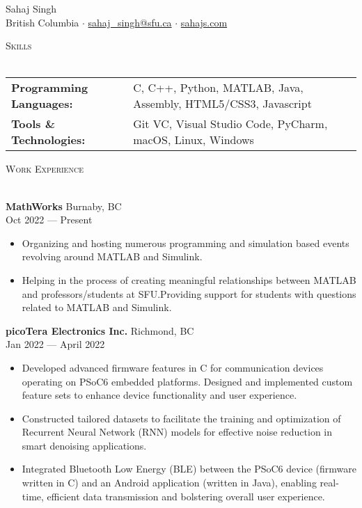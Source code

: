 \documentclass[a4paper]{article}
\newcommand{\lineunder} {
    \vspace*{-8pt} \\
    \hspace*{-18pt} \hrulefill\\
}
\newcommand{\header} [1] {
    {\hspace*{-18pt}\vspace*{6pt} \textsc{#1}}
    \vspace*{-6pt} \lineunder{}
}
\begin{document}
\vspace*{-40pt}

\vspace*{-10pt}
\begin{center}
	{\Huge {Sahaj Singh}}\\
    \vspace{1mm}
	British Columbia $\cdot$ \href{mailto:sahaj_singh@sfu.ca}{sahaj\_singh@sfu.ca} $\cdot$ \href{http://sahajs.com}{sahajs.com}\\
\end{center}

\header{Skills}
\begin{tabular}{ l l }
	\textbf{Programming Languages:} & C, C++, Python, MATLAB, Java, Assembly, HTML5/CSS3, Javascript \\
	\textbf{Tools \& Technologies:} & Git VC, Visual Studio Code, PyCharm, macOS, Linux, Windows         \\
\end{tabular}
\vspace{2mm}

\header{Work Experience}
\vspace{1mm}

\textbf{MathWorks} \hfill Burnaby, BC\\
 \hfill Oct 2022 --- Present\\
\vspace{-3mm}
\begin{itemize} \itemsep-3pt
	\item Organizing and hosting numerous programming and simulation based events revolving around MATLAB and Simulink.
	\item Helping in the process of creating meaningful relationships between MATLAB and professors/students at SFU.\@ Providing support for students with questions related to MATLAB and Simulink.
\end{itemize}
\vspace{-1mm}
\textbf{picoTera Electronics Inc.} \hfill Richmond, BC\\
 \hfill Jan 2022 --- April 2022\\
\vspace{-3mm}
\begin{itemize} \itemsep-3pt
	\item Developed advanced firmware features in C for communication devices operating on PSoC6 embedded platforms. Designed and implemented custom feature sets to enhance device functionality and user experience.
	\item Constructed tailored datasets to facilitate the training and optimization of Recurrent Neural Network (RNN) models for effective noise reduction in smart denoising applications.
	\item Integrated Bluetooth Low Energy (BLE) between the PSoC6 device (firmware written in C) and an Android application (written in Java), enabling real-time, efficient data transmission and bolstering overall user experience.
\end{itemize}
\end{document}
